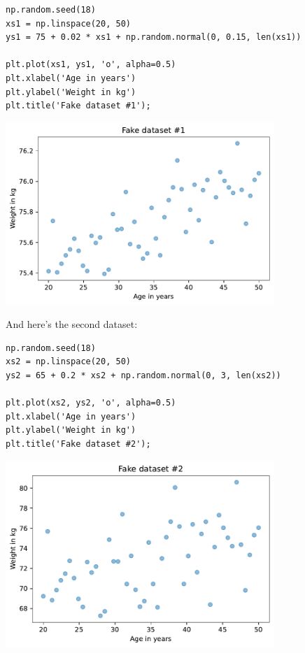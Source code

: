 \begin{lstlisting}[]
np.random.seed(18)
xs1 = np.linspace(20, 50)
ys1 = 75 + 0.02 * xs1 + np.random.normal(0, 0.15, len(xs1))

plt.plot(xs1, ys1, 'o', alpha=0.5)
plt.xlabel('Age in years')
plt.ylabel('Weight in kg')
plt.title('Fake dataset #1');
\end{lstlisting}

\begin{center}
\includegraphics[width=4in]{chapters/09_relationships_files/09_relationships_66_0.pdf}
\end{center}

And here's the second dataset:

\begin{lstlisting}[]
np.random.seed(18)
xs2 = np.linspace(20, 50)
ys2 = 65 + 0.2 * xs2 + np.random.normal(0, 3, len(xs2))

plt.plot(xs2, ys2, 'o', alpha=0.5)
plt.xlabel('Age in years')
plt.ylabel('Weight in kg')
plt.title('Fake dataset #2');
\end{lstlisting}

\begin{center}
\includegraphics[width=4in]{chapters/09_relationships_files/09_relationships_68_0.pdf}
\end{center}

